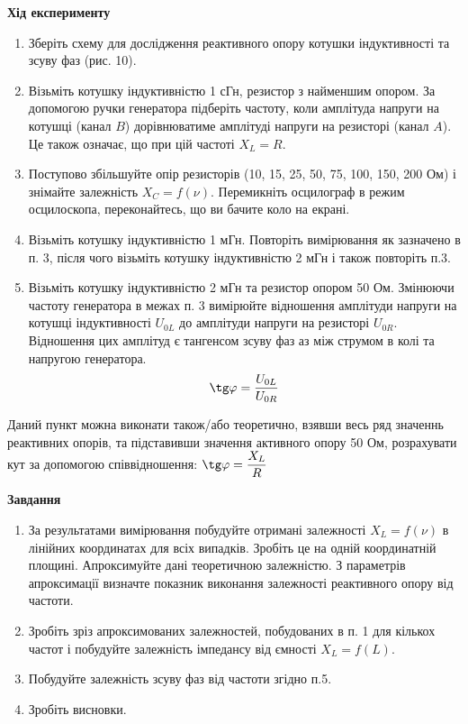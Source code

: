 \documentclass[a4paper,12pt]{article}
\begin{document}
\newpage
    \begin{center}
		\textbf{Хід експерименту}
	\end{center}
    \begin{enumerate}
        \item Зберіть схему для дослідження реактивного опору котушки індуктивності та зсуву фаз (рис. 10).
        \item Візьміть котушку індуктивністю 1 сГн, резистор з найменшим опором. За 
        допомогою ручки генератора підберіть частоту, коли амплітуда напруги на 
        котушці (канал $B$) дорівнюватиме амплітуді напруги на резисторі (канал $A$). 
        Це також означає, що при цій частоті $X_L=R$.
        \item Поступово збільшуйте опір резисторів (10, 15, 25, 50, 75, 100, 150, 200 Ом) і 
        знімайте залежність $X_C=f(\nu)$. Перемикніть осцилограф в режим осцилоскопа, переконайтесь, що ви бачите коло на екрані.
        \item Візьміть котушку індуктивністю 1 мГн. Повторіть вимірювання як зазначено 
        в п. 3, після чого візьміть котушку індуктивністю 2 мГн і також повторіть п.3.
        \item Візьміть котушку індуктивністю 2 мГн та резистор опором 50 Ом. Змінюючи 
        частоту генератора в межах п. 3 вимірюйте відношення амплітуди напруги на 
        котушці індуктивності $U_{0L}$ до амплітуди напруги на резисторі $U_{0R}$. Відношення 
        цих амплітуд є тангенсом зсуву фаз аз між струмом в колі та напругою генератора.
        $$\tg\varphi=\dfrac{U_{0L}}{U_{0R}}$$
    \end{enumerate}

    Даний пункт можна виконати також/або теоретично, взявши весь ряд 
    значеннь реактивних опорів, та підставивши значення активного опору 50 Ом, 
    розрахувати кут за допомогою співвідношення: $\tg\varphi=\dfrac{X_L}{R}$ 
    \begin{center}
		\textbf{Завдання}
	\end{center}
    \begin{enumerate}
        \item За результатами вимірювання побудуйте отримані залежності $X_L=f(\nu )$ в лінійних координатах для всіх випадків. Зробіть це на одній координатній площині. 
        Апроксимуйте дані теоретичною залежністю. З параметрів апроксимації визначте 
        показник виконання залежності реактивного опору від частоти.
        \item Зробіть зріз апроксимованих залежностей, побудованих в п. 1 для кількох частот 
        і побудуйте залежність імпедансу від ємності $X_L=f(L)$. 
        \item Побудуйте залежність зсуву фаз від частоти згідно п.5.
        \item Зробіть висновки.
    \end{enumerate}
\end{document}
